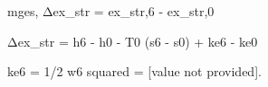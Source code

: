 mges, Δex_str = ex_str,6 - ex_str,0  

Δex_str = h6 - h0 - T0 (s6 - s0) + ke6 - ke0  

ke6 = 1/2 w6 squared = [value not provided].